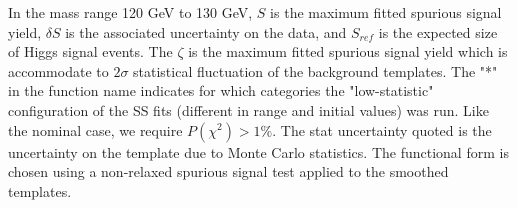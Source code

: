 \begin{table}[!h]
{   In the mass range 120 GeV to 130 GeV, $S$ is the maximum fitted spurious signal yield, $\delta S$ is the associated uncertainty on the data, and $S_{ref}$ is the expected size of Higgs signal events.
   The $\zeta$ is the maximum fitted spurious signal yield which is accommodate to $2\sigma$ statistical fluctuation of the background templates.
   The "*" in the function name indicates for which categories the "low-statistic" configuration of the SS fits (different in range and initial values) was run. Like the nominal case, we require $P(\chi^2) > 1\%$. The stat uncertainty quoted is the uncertainty on the template due to Monte Carlo statistics. The functional form is chosen using a non-relaxed spurious signal test applied to the smoothed templates.
      \label{tab:spurious_sig_gptight} }
\end{table}


